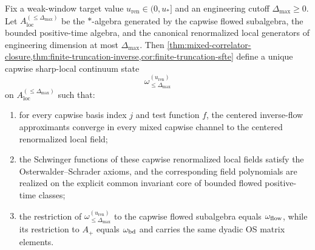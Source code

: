 \begin{theorem}\label{thm:finite-cap-extension}
Fix a weak-window target value $u_{\mathrm{ren}}\in(0,u_*]$ and an engineering cutoff $\Delta_{\max}\ge 0$. Let $A_{\mathrm{loc}}^{(\le \Delta_{\max})}$ be the $\ast$-algebra generated by the capwise flowed subalgebra, the bounded positive-time algebra, and the canonical renormalized local generators of engineering dimension at most $\Delta_{\max}$. Then \cref{thm:mixed-correlator-closure,thm:finite-truncation-inverse,cor:finite-truncation-sfte} define a unique capwise sharp-local continuum state
\[
\omega_{\le \Delta_{\max}}^{(u_{\mathrm{ren}})}
\]
on $A_{\mathrm{loc}}^{(\le \Delta_{\max})}$ such that:
\begin{enumerate}[label=\textup{(\alph*)},leftmargin=2.25em]
\item for every capwise basis index $j$ and test function $f$, the centered inverse-flow approximants converge in every mixed capwise channel to the centered renormalized local field;
\item the Schwinger functions of these capwise renormalized local fields satisfy the Osterwalder--Schrader axioms, and the corresponding field polynomials are realized on the explicit common invariant core of bounded flowed positive-time classes;
\item the restriction of $\omega_{\le \Delta_{\max}}^{(u_{\mathrm{ren}})}$ to the capwise flowed subalgebra equals $\omega_{\mathrm{flow}}$, while its restriction to $A_+$ equals $\omega_{\mathrm{bd}}$ and carries the same dyadic OS matrix elements.
\end{enumerate}
\end{theorem}

